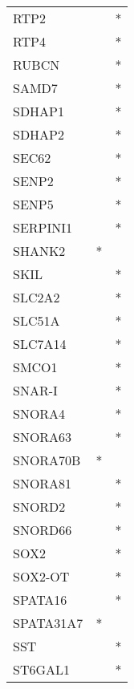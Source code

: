 \begin{longtable}{lcc}
RTP2             &                &          * \\
RTP4             &                &          * \\
RUBCN            &                &          * \\
SAMD7            &                &          * \\
SDHAP1           &                &          * \\
SDHAP2           &                &          * \\
SEC62            &                &          * \\
SENP2            &                &          * \\
SENP5            &                &          * \\
SERPINI1         &                &          * \\
SHANK2           &              * &            \\
SKIL             &                &          * \\
SLC2A2           &                &          * \\
SLC51A           &                &          * \\
SLC7A14          &                &          * \\
SMCO1            &                &          * \\
SNAR-I           &                &          * \\
SNORA4           &                &          * \\
SNORA63          &                &          * \\
SNORA70B         &              * &            \\
SNORA81          &                &          * \\
SNORD2           &                &          * \\
SNORD66          &                &          * \\
SOX2             &                &          * \\
SOX2-OT          &                &          * \\
SPATA16          &                &          * \\
SPATA31A7        &              * &            \\
SST              &                &          * \\
ST6GAL1          &                &          * \\

\end{longtable}
